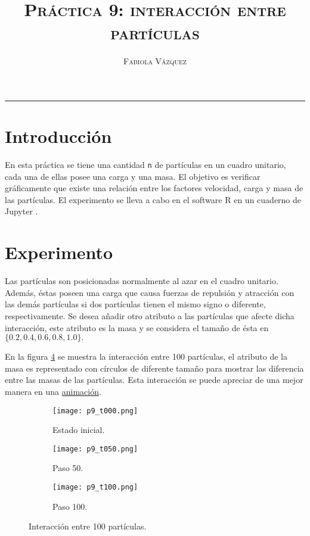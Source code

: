 \documentclass[12pt,letterpaper]{article}
\title{\textsc{Práctica 9: interacción entre partículas}}
\author{\textsc{Fabiola Vázquez}}
\begin{document}
\maketitle

\hrule
\section{Introducción}
En esta práctica \cite{elisapractica9} se tiene una cantidad \texttt{n} de partículas en un cuadro unitario, cada una de ellas posee una carga y una masa. El objetivo es verificar gráficamente que existe una relación entre los factores velocidad, carga y masa de las partículas. El experimento se lleva a cabo en el software R \cite{R} en un cuaderno de Jupyter \cite{jupyter}.

\section{Experimento}
Las partículas son posicionadas normalmente al azar en el cuadro unitario. Además, éstas poseen una carga que causa fuerzas de repulsión y atracción con las demás partículas si dos partículas tienen el mismo signo o diferente, respectivamente. Se desea añadir otro atributo a las partículas que afecte dicha interacción, este atributo es la masa y se considera el tamaño de ésta en $\{0.2, 0.4, 0.6, 0.8, 1.0\}.$ 

En la figura \ref{im} se muestra la interacción entre 100 partículas, el atributo de la masa es representado con círculos de diferente tamaño para mostrar las diferencia entre las masas de las partículas. Esta interacción se puede apreciar de una mejor manera en una \href{https://github.com/fvzqa/Simulacion/blob/master/Tarea09/Images/p9.gif}{animación}.
 \begin{figure}
 	\centering 
 	\begin{subfigure}[b]{0.3\linewidth}
 		\texttt{[image: p9\_t000.png]} 		
 		\caption{Estado inicial.}
 		 		\label{1}
 	\end{subfigure}  \hfill
 	\begin{subfigure}[b]{0.3\linewidth}
 		\texttt{[image: p9\_t050.png]} 		
 		\caption{Paso 50.}
 		\label{2}
 	\end{subfigure} \hfill
 	 	\begin{subfigure}[b]{0.3\linewidth}
 		\texttt{[image: p9\_t100.png]} 		
 		\caption{Paso 100.}
 		\label{3}
 	\end{subfigure}
 	 	\caption{Interacción entre 100 partículas.} 
 	 		\label{im}
\end{figure} 
\end{document}
